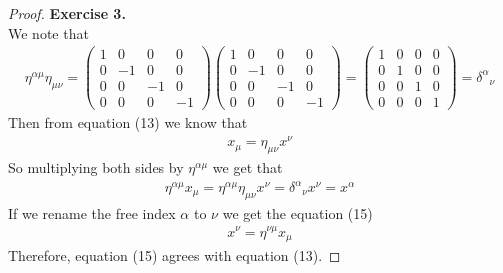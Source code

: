 \documentclass[11pt]{article}
\theoremstyle{definition}
\begin{document}
\cleardoublepage
\begin{proof}{\textbf{Exercise 3.}}\\
We note that
\begin{align*}
    \eta^{\alpha\mu}\eta_{\mu\nu}
    = \begin{pmatrix}
        1 & 0 & 0 & 0 \\    
        0 & -1 & 0 & 0 \\
        0 & 0 & -1 & 0 \\
        0 & 0 & 0 & -1
    \end{pmatrix}
    \begin{pmatrix}
        1 & 0 & 0 & 0 \\    
        0 & -1 & 0 & 0 \\
        0 & 0 & -1 & 0 \\
        0 & 0 & 0 & -1
    \end{pmatrix}
    = \begin{pmatrix}
        1 & 0 & 0 & 0 \\    
        0 & 1 & 0 & 0 \\
        0 & 0 & 1 & 0 \\
        0 & 0 & 0 & 1
    \end{pmatrix}
    = {\delta^{\alpha}}_{\nu}
\end{align*}
Then from equation (13) we know that
\begin{align*}
    x_\mu = \eta_{\mu\nu}x^\nu
\end{align*}
So multiplying both sides by $\eta^{\alpha\mu}$ we get that
\begin{align*}
    \eta^{\alpha\mu}x_\mu = \eta^{\alpha\mu}\eta_{\mu\nu}x^\nu
    = {\delta^\alpha}_\nu x^\nu = x^\alpha
\end{align*}
If we rename the free index $\alpha$ to $\nu$ we get the equation (15)
\begin{align*}
    x^\nu = \eta^{\nu\mu}x_\mu
\end{align*}
Therefore, equation (15) agrees with equation (13).
\end{proof}
\end{document}

